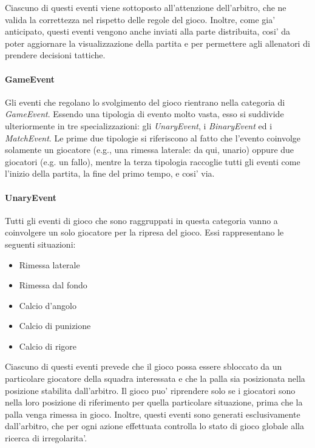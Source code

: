Ciascuno di questi eventi viene sottoposto all'attenzione dell'arbitro, che ne valida la correttezza nel rispetto delle regole del gioco. Inoltre, come gia' anticipato, questi eventi vengono anche inviati alla parte distribuita, cosi' da poter aggiornare la visualizzazione della partita e per permettere agli allenatori di prendere decisioni tattiche.

\paragraph{GameEvent} Gli eventi che regolano lo svolgimento del gioco rientrano nella categoria di \textit{GameEvent}. Essendo una tipologia di evento molto vasta, esso si suddivide ulteriormente in tre specializzazioni: gli \textit{UnaryEvent}, i \textit{BinaryEvent} ed i \textit{MatchEvent}. Le prime due tipologie si riferiscono al fatto che l'evento coinvolge solamente un giocatore (e.g., una rimessa laterale: da qui, unario) oppure due giocatori (e.g. un fallo), mentre la terza tipologia raccoglie tutti gli eventi come l'inizio della partita, la fine del primo tempo, e cosi' via.\\

\paragraph{UnaryEvent} Tutti gli eventi di gioco che sono raggruppati in questa categoria vanno a coinvolgere un solo giocatore per la ripresa del gioco. Essi rappresentano le seguenti situazioni:

\begin{itemize}
	\item Rimessa laterale
	\item Rimessa dal fondo
	\item Calcio d'angolo
	\item Calcio di punizione
	\item Calcio di rigore
\end{itemize}

Ciascuno di questi eventi prevede che il gioco possa essere sbloccato da un particolare giocatore della squadra interessata e che la palla sia posizionata nella posizione stabilita dall'arbitro. Il gioco puo' riprendere solo se i giocatori sono nella loro posizione di riferimento per quella particolare situazione, prima che la palla venga rimessa in gioco. Inoltre, questi eventi sono generati esclusivamente dall'arbitro, che per ogni azione effettuata controlla lo stato di gioco globale alla ricerca di irregolarita'.

